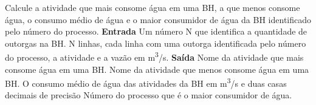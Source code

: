 \documentclass[a4paper, 12pt]{article}
\begin{document}
Calcule a atividade que mais consome água em uma BH, a que menos consome água, o consumo médio de água e o maior consumidor de água da BH identificado pelo número do processo.
\newline \newline
\textbf{{\large Entrada}} \newline
Um número N que identifica a quantidade de outorgas na BH. \newline
N linhas, cada linha com uma outorga identificada pelo número do processo, a atividade e a vazão em m\textsuperscript{3}/s.
\newline \newline
\textbf{{\large Saída}} \newline
Nome da atividade que mais consome água em uma BH. \newline
Nome da atividade que menos consome água em uma BH. \newline
O consumo médio de água das atividades da BH em m\textsuperscript{3}/s e duas casas decimais de precisão \newline
Número do processo que é o maior consumidor de água.
\newline \newline
\newline
\end{document}
